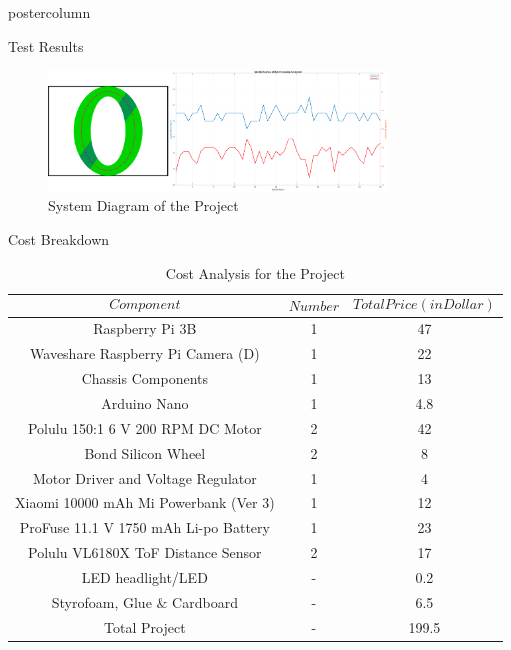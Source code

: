 \documentclass{beamer}
\begin{document}
\begin{frame}
\begin{columns}
\begin{column}{.5\textwidth}
\begin{beamercolorbox}[center]{postercolumn}
\begin{minipage}{.98\textwidth}
{\begin{myblock}{Test Results}
			
			\begin{figure}
				\centering
				\includegraphics[width=0.8\textwidth]{img/stabilityTestS}
				\caption{System Diagram of the Project}
				\label{fig:overall-system}
			\end{figure}
				\-\vspace{-2cm}
					\end{myblock} \vspace{-0.4em}
					\begin{myblock}{Cost Breakdown}
						\begin{table}[H]
						\centering
						\caption{Cost Analysis for the Project}
						\begin{tabular}{c c c}
							$$Component$$ & $$Number$$ & $$Total Price (in Dollar)$$  \\ \hline
							Raspberry Pi 3B & 1 & 47   \\ 
							Waveshare Raspberry Pi Camera (D) & 1 & 22   \\ 
							Chassis Components & 1 & 13   \\ 
							Arduino Nano & 1 &  4.8 \\ 
							Polulu 150:1 6 V 200 RPM DC Motor & 2 & 42 \\ 
							Bond Silicon Wheel & 2 & 8 \\ 
							Motor Driver and Voltage Regulator & 1 &  4 \\ 
							Xiaomi 10000 mAh Mi Powerbank (Ver 3) & 1 & 12 \\ 
							ProFuse 11.1 V 1750 mAh Li-po Battery  & 1 & 23 \\ 
							Polulu VL6180X ToF Distance Sensor & 2 & 17 \\
							LED headlight/LED & - & 0.2 \\ 
							Styrofoam, Glue $\&$ Cardboard & - & 6.5 \\ \hline
							Total Project & - & 199.5 
						\end{tabular} 
						\label{tab:cost}
					\end{table}
				\-\vspace{-1cm}
					\end{myblock} \vspace{-0.4em}
}
\end{minipage}
\end{beamercolorbox}
\end{column}
\end{columns}
\end{frame}
\end{document}

